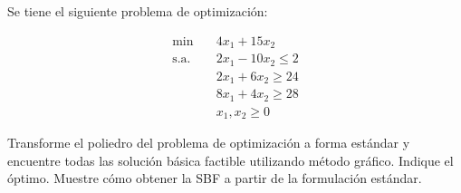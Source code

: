 Se tiene el siguiente problema de optimización:

\begin{align*}
    \min \quad & 4x_1 + 15x_2 \\
    \text{s.a.} \quad & 2x_1 - 10x_2 \leq 2 \\
    & 2x_1 + 6x_2 \geq 24 \\
    & 8x_1 + 4x_2 \geq 28 \\
    & x_1, x_2 \geq 0
\end{align*}

Transforme el poliedro del problema de optimización a forma estándar y encuentre todas las solución básica factible utilizando método gráfico. Indique el óptimo. Muestre cómo obtener la SBF a partir de la formulación estándar.

